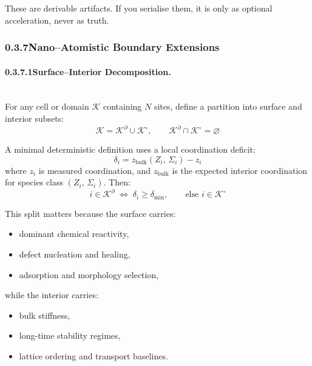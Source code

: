 \documentclass[11pt, a4paper, oneside]{article}
\theoremstyle{definition}
\theoremstyle{remark}
\begin{document}
These are derivable artifacts.  If you serialise them, it is only as
optional acceleration, never as truth.



\bigskip
\subsubsection*{0.3.7\quad Nano–Atomistic Boundary Extensions}
\label{sec:nano-atomistic}

\paragraph{0.3.7.1\quad Surface–Interior Decomposition.}
\label{sec:surface-interior}
\mbox{}\\[0.4em]

For any cell or domain $\mathcal{K}$ containing $N$ sites, define a
partition into surface and interior subsets:
\begin{equation}
  \mathcal{K} = \mathcal{K}^{\partial}
  \cup \mathcal{K}^{\circ},
  \qquad
  \mathcal{K}^{\partial}
  \cap \mathcal{K}^{\circ} = \varnothing
  \label{eq:surface-split}
\end{equation}

A minimal deterministic definition uses a local coordination deficit:
\begin{equation}
  \delta_i = z_{\text{bulk}}(Z_i,\,\Sigma_i) - z_i
  \label{eq:coord-deficit}
\end{equation}
where $z_i$ is measured coordination, and $z_{\text{bulk}}$ is the
expected interior coordination for species class
$(Z_i,\,\Sigma_i)$.  Then:
\[
  i \in \mathcal{K}^{\partial}
  \;\Longleftrightarrow\;
  \delta_i \geq \delta_{\min},
  \qquad
  \text{else } i \in \mathcal{K}^{\circ}
\]

This split matters because the surface carries:
\begin{itemize}
  \item dominant chemical reactivity,
  \item defect nucleation and healing,
  \item adsorption and morphology selection,
\end{itemize}
while the interior carries:
\begin{itemize}
  \item bulk stiffness,
  \item long-time stability regimes,
  \item lattice ordering and transport baselines.
\end{itemize}
\end{document}

